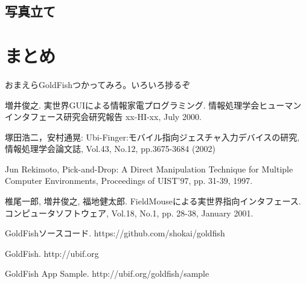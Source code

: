 \subsection{写真立て}


\section{まとめ}
おまえらGoldFishつかってみろ。いろいろ捗るぞ


\begin{thebibliography}{10}

増井俊之. 実世界GUIによる情報家電プログラミング. 情報処理学会ヒューマンインタフェース研究会研究報告 xx-HI-xx, July 2000.

塚田浩二，安村通晃: Ubi-Finger:モバイル指向ジェスチャ入力デバイスの研究, 情報処理学会論文誌, Vol.43, No.12, pp.3675-3684 (2002)

Jun Rekimoto, Pick-and-Drop: A Direct Manipulation Technique for Multiple Computer Environments, Proceedings of UIST'97, pp. 31-39, 1997.

椎尾一郎, 増井俊之, 福地健太郎. FieldMouseによる実世界指向インタフェース. コンピュータソフトウェア, Vol.18, No.1, pp. 28-38, January 2001.

GoldFishソースコード. https://github.com/shokai/goldfish

GoldFish. http://ubif.org

GoldFish App Sample. http://ubif.org/goldfish/sample

\end{thebibliography}

